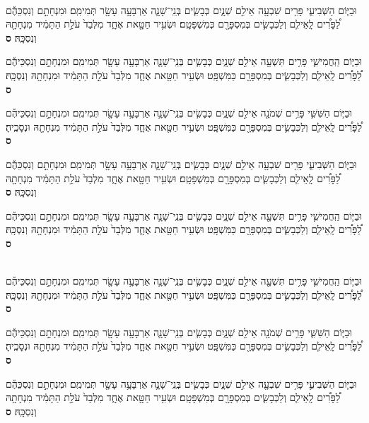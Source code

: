 \documentclass[twoside, openany, parskip=half, 11pt]{book}
\begin{document}
\begin{footnotesize}
\begin{multicols}{2}
\\
וּבַיּ֧וֹם הַשְּׁבִיעִ֛י פָּרִ֥ים שִׁבְעָ֖ה אֵילִ֣ם שְׁנָ֑יִם כְּבָשִׂ֧ים בְּנֵֽי־שָׁנָ֛ה אַרְבָּעָ֥ה עָשָׂ֖ר תְּמִימִֽם׃ וּמִנְחָתָ֣ם וְנִסְכֵּהֶ֡ם לַ֠פָּרִ֠ים לָֽאֵילִ֧ם וְלַכְּבָשִׂ֛ים בְּמִסְפָּרָ֖ם כְּמִשְׁפָּטָֽם׃ וּשְׂעִ֥יר חַטָּ֖את אֶחָ֑ד מִלְּבַד֙ עֹלַ֣ת הַתָּמִ֔יד מִנְחָתָ֖הּ וְנִסְכָּֽהּ׃ \textbf{ס} 

וּבַיּ֧וֹם הַֽחֲמִישִׁ֛י פָּרִ֥ים תִּשְׁעָ֖ה אֵילִ֣ם שְׁנָ֑יִם כְּבָשִׂ֧ים בְּנֵֽי־שָׁנָ֛ה אַרְבָּעָ֥ה עָשָׂ֖ר תְּמִימִֽם׃ וּמִנְחָתָ֣ם וְנִסְכֵּיהֶ֡ם לַ֠פָּרִ֠ים לָֽאֵילִ֧ם וְלַכְּבָשִׂ֛ים בְּמִסְפָּרָ֖ם כַּמִּשְׁפָּֽט׃ וּשְׂעִ֥יר חַטָּ֖את אֶחָ֑ד מִלְּבַד֙ עֹלַ֣ת הַתָּמִ֔יד וּמִנְחָתָ֖הּ וְנִסְכָּֽהּ׃ \textbf{ס} 

וּבַיּ֧וֹם הַשִּׁשִּׁ֛י פָּרִ֥ים שְׁמֹנָ֖ה אֵילִ֣ם שְׁנָ֑יִם כְּבָשִׂ֧ים בְּנֵֽי־שָׁנָ֛ה אַרְבָּעָ֥ה עָשָׂ֖ר תְּמִימִֽם׃ וּמִנְחָתָ֣ם וְנִסְכֵּיהֶ֡ם לַ֠פָּרִ֠ים לָֽאֵילִ֧ם וְלַכְּבָשִׂ֛ים בְּמִסְפָּרָ֖ם כַּמִּשְׁפָּֽט׃ וּשְׂעִ֥יר חַטָּ֖את אֶחָ֑ד מִלְּבַד֙ עֹלַ֣ת הַתָּמִ֔יד מִנְחָתָ֖הּ וּנְסָכֶֽיהָ׃ \textbf{ס}\

וּבַיּ֧וֹם הַשְּׁבִיעִ֛י פָּרִ֥ים שִׁבְעָ֖ה אֵילִ֣ם שְׁנָ֑יִם כְּבָשִׂ֧ים בְּנֵֽי־שָׁנָ֛ה אַרְבָּעָ֥ה עָשָׂ֖ר תְּמִימִֽם׃ וּמִנְחָתָ֣ם וְנִסְכֵּהֶ֡ם לַ֠פָּרִ֠ים לָֽאֵילִ֧ם וְלַכְּבָשִׂ֛ים בְּמִסְפָּרָ֖ם כְּמִשְׁפָּטָֽם׃ וּשְׂעִ֥יר חַטָּ֖את אֶחָ֑ד מִלְּבַד֙ עֹלַ֣ת הַתָּמִ֔יד מִנְחָתָ֖הּ וְנִסְכָּֽהּ׃ \textbf{ס} 

וּבַיּ֧וֹם הַֽחֲמִישִׁ֛י פָּרִ֥ים תִּשְׁעָ֖ה אֵילִ֣ם שְׁנָ֑יִם כְּבָשִׂ֧ים בְּנֵֽי־שָׁנָ֛ה אַרְבָּעָ֥ה עָשָׂ֖ר תְּמִימִֽם׃ וּמִנְחָתָ֣ם וְנִסְכֵּיהֶ֡ם לַ֠פָּרִ֠ים לָֽאֵילִ֧ם וְלַכְּבָשִׂ֛ים בְּמִסְפָּרָ֖ם כַּמִּשְׁפָּֽט׃ וּשְׂעִ֥יר חַטָּ֖את אֶחָ֑ד מִלְּבַד֙ עֹלַ֣ת הַתָּמִ֔יד וּמִנְחָתָ֖הּ וְנִסְכָּֽהּ׃ \textbf{ס} 

\\
וּבַיּ֧וֹם הַֽחֲמִישִׁ֛י פָּרִ֥ים תִּשְׁעָ֖ה אֵילִ֣ם שְׁנָ֑יִם כְּבָשִׂ֧ים בְּנֵֽי־שָׁנָ֛ה אַרְבָּעָ֥ה עָשָׂ֖ר תְּמִימִֽם׃ וּמִנְחָתָ֣ם וְנִסְכֵּיהֶ֡ם לַ֠פָּרִ֠ים לָֽאֵילִ֧ם וְלַכְּבָשִׂ֛ים בְּמִסְפָּרָ֖ם כַּמִּשְׁפָּֽט׃ וּשְׂעִ֥יר חַטָּ֖את אֶחָ֑ד מִלְּבַד֙ עֹלַ֣ת הַתָּמִ֔יד וּמִנְחָתָ֖הּ וְנִסְכָּֽהּ׃ \textbf{ס} 

וּבַיּ֧וֹם הַשִּׁשִּׁ֛י פָּרִ֥ים שְׁמֹנָ֖ה אֵילִ֣ם שְׁנָ֑יִם כְּבָשִׂ֧ים בְּנֵֽי־שָׁנָ֛ה אַרְבָּעָ֥ה עָשָׂ֖ר תְּמִימִֽם׃ וּמִנְחָתָ֣ם וְנִסְכֵּיהֶ֡ם לַ֠פָּרִ֠ים לָֽאֵילִ֧ם וְלַכְּבָשִׂ֛ים בְּמִסְפָּרָ֖ם כַּמִּשְׁפָּֽט׃ וּשְׂעִ֥יר חַטָּ֖את אֶחָ֑ד מִלְּבַד֙ עֹלַ֣ת הַתָּמִ֔יד מִנְחָתָ֖הּ וּנְסָכֶֽיהָ׃ \textbf{ס} 

וּבַיּ֧וֹם הַשְּׁבִיעִ֛י פָּרִ֥ים שִׁבְעָ֖ה אֵילִ֣ם שְׁנָ֑יִם כְּבָשִׂ֧ים בְּנֵֽי־שָׁנָ֛ה אַרְבָּעָ֥ה עָשָׂ֖ר תְּמִימִֽם׃ וּמִנְחָתָ֣ם וְנִסְכֵּהֶ֡ם לַ֠פָּרִ֠ים לָֽאֵילִ֧ם וְלַכְּבָשִׂ֛ים בְּמִסְפָּרָ֖ם כְּמִשְׁפָּטָֽם׃ וּשְׂעִ֥יר חַטָּ֖את אֶחָ֑ד מִלְּבַד֙ עֹלַ֣ת הַתָּמִ֔יד מִנְחָתָ֖הּ וְנִסְכָּֽהּ׃ \textbf{ס} 


\end{multicols}
\end{footnotesize}
\end{document}
